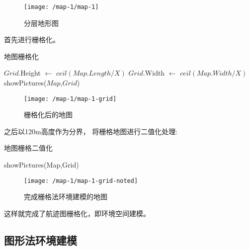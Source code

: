 \documentclass[12pt,a4paper,oneside,UTF8]{ctexart}
\begin{document}
\begin{figure}[H]
  \centering
  \texttt{[image: /map-1/map-1]}
  \caption{分层地形图}
  \label{fig:map-1}
\end{figure}

首先进行栅格化。

\begin{algorithm}[H]
  \caption{地图栅格化}\label{algorithm-grid}

  $Grid$.Height $\leftarrow$ $ceil(Map.Length/X)$\;
  $Grid$.Width $\leftarrow$ $ceil(Map.Width/X)$\;
  showPictures($Map$,$Grid$)\;
\end{algorithm}

\begin{figure}[H]
  \centering
  \texttt{[image: /map-1/map-1-grid]}
  \caption{栅格化后的地图}
  \label{fig:map-1-grid}
\end{figure}

之后以120m高度作为分界，
将栅格地图进行二值化处理:

\begin{algorithm}[H]
  \caption{地图栅格二值化}\label{algorithm-grid-noted}

  showPictures(Map,Grid)\;
\end{algorithm}

\begin{figure}[H]
  \centering
  \texttt{[image: /map-1/map-1-grid-noted]}
  \caption{完成栅格法环境建模的地图}
  \label{fig:map-1-grid-noted}
\end{figure}

这样就完成了航迹图栅格化，即环境空间建模。
\subsection{图形法环境建模}
\end{document}
